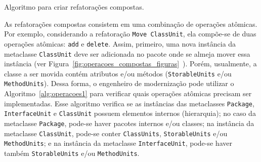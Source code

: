 \begin{algoritmo}[!h]
     \SetAlgoLined
     \caption{Algoritmo para criar refatorações compostas.}
     \label{alg:operacoes1}
   \end{algoritmo}

As refatorações compostas consistem em uma combinação de operações atômicas. Por exemplo, considerando a refatoração \texttt{Move ClassUnit}, ela compõe-se de duas operações atômicas: \texttt{add} e \texttt{delete}. Assim, primeiro, uma nova instância da metaclasse \texttt{ClassUnit} deve ser adicionada no pacote onde se almeja mover essa instância (ver Figura~\ref{fig:operacoes_compostas_figuras}~). Porém, usualmente, a classe a ser movida contém atributos e/ou métodos (\texttt{StorableUnits} e/ou \texttt{MethodUnits}). Dessa forma, o engenheiro de modernização pode utilizar o Algoritmo~\ref{alg:operacoes1} para verificar quais operações atômicas precisam ser implementadas. Esse algoritmo verifica se as instâncias das metaclasses \texttt{Package}, \texttt{InterfaceUnit} e \texttt{ClassUnit} possuem elementos internos (hierarquia); no caso da metaclasse \texttt{Package}, pode-se haver pacotes internos e/ou classes; na instância da metaclasse \texttt{ClassUnit}, pode-se conter \texttt{ClassUnits}, \texttt{StorableUnits} e/ou \texttt{MethodUnits}; e na instância da metaclasse \texttt{InterfaceUnit}, pode-se haver também \texttt{StorableUnits} e/ou \texttt{MethodUnits}. 

